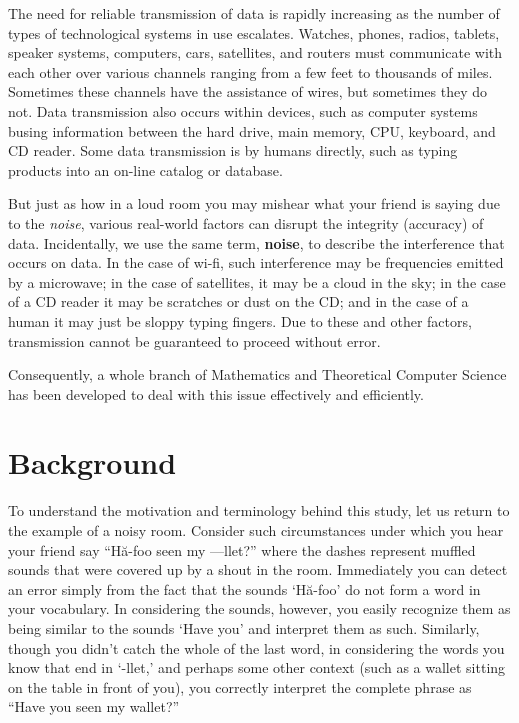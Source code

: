 \documentclass[11pt]{article}
\begin{document}
The need for reliable transmission of data is rapidly increasing as the number of types of technological systems in use escalates. Watches, phones, radios, tablets, speaker systems, computers, cars, satellites, and routers must communicate with each other over various channels ranging from a few feet to thousands of miles. Sometimes these channels have the assistance of wires, but sometimes they do not. Data transmission also occurs within devices, such as computer systems busing information between the hard drive, main memory, CPU, keyboard, and CD reader. Some data transmission is by humans directly, such as typing products into an on-line catalog or database.

But just as how in a loud room you may mishear what your friend is saying due to the \emph{noise}, various real-world factors can disrupt the integrity (accuracy) of data. Incidentally, we use the same term, \textbf{noise}, to describe the interference that occurs on data. In the case of wi-fi, such interference may be frequencies emitted by a microwave; in the case of satellites, it may be a cloud in the sky; in the case of a CD reader it may be scratches or dust on the CD; and in the case of a human it may just be sloppy typing fingers. Due to these and other factors, transmission cannot be guaranteed to proceed without error.

Consequently, a whole branch of Mathematics and Theoretical Computer Science has been developed to deal with this issue effectively and efficiently.

\section{Background}

To understand the motivation and terminology behind this study, let us return to the example of a noisy room. Consider such circumstances under which you hear your friend say ``H\u{a}-foo seen my ---llet?'' where the dashes represent muffled sounds that were covered up by a shout in the room. Immediately you can detect an error simply from the fact that the sounds `H\u{a}-foo' do not form a word in your vocabulary. In considering the sounds, however, you easily recognize them as being similar to the sounds `Have you' and interpret them as such. Similarly, though you didn't catch the whole of the last word, in considering the words you know that end in `-llet,' and perhaps some other context (such as a wallet sitting on the table in front of you), you correctly interpret the complete phrase as ``Have you seen my wallet?''
\end{document}
